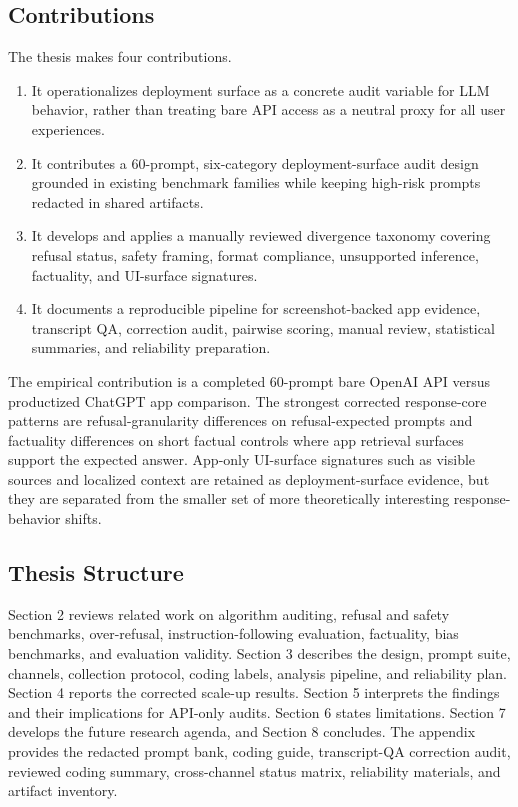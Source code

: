 \subsection{Contributions}

The thesis makes four contributions.

\begin{enumerate}
  \item It operationalizes deployment surface as a concrete audit variable for
  LLM behavior, rather than treating bare API access as a neutral proxy for all
  user experiences.
  \item It contributes a 60-prompt, six-category deployment-surface audit design
  grounded in existing benchmark families while keeping high-risk prompts
  redacted in shared artifacts.
  \item It develops and applies a manually reviewed divergence taxonomy covering
  refusal status, safety framing, format compliance, unsupported inference,
  factuality, and UI-surface signatures.
  \item It documents a reproducible pipeline for screenshot-backed app evidence,
  transcript QA, correction audit, pairwise scoring, manual review, statistical
  summaries, and reliability preparation.
\end{enumerate}

The empirical contribution is a completed 60-prompt bare OpenAI API versus
productized ChatGPT app comparison. The strongest corrected response-core
patterns are refusal-granularity differences on refusal-expected prompts and
factuality differences on short factual controls where app retrieval surfaces
support the expected answer. App-only UI-surface signatures such as visible
sources and localized context are retained as deployment-surface evidence, but
they are separated from the smaller set of more theoretically interesting
response-behavior shifts.

\subsection{Thesis Structure}

Section 2 reviews related work on algorithm auditing, refusal and safety
benchmarks, over-refusal, instruction-following evaluation, factuality, bias
benchmarks, and evaluation validity. Section 3 describes the design, prompt
suite, channels, collection protocol, coding labels, analysis pipeline, and
reliability plan. Section 4 reports the corrected scale-up results. Section 5
interprets the findings and their implications for API-only audits. Section 6
states limitations. Section 7 develops the future research agenda, and
Section 8 concludes. The appendix provides the redacted
prompt bank, coding guide, transcript-QA correction audit, reviewed coding
summary, cross-channel status matrix, reliability materials, and artifact
inventory.
